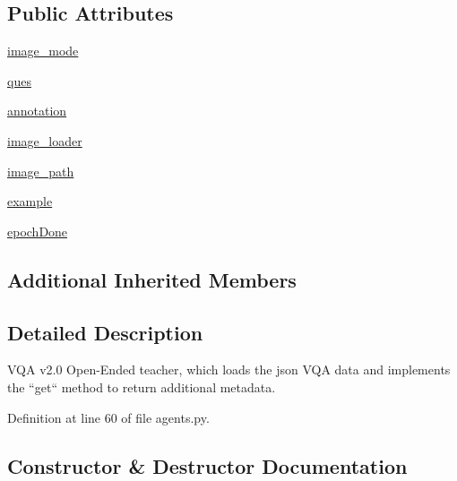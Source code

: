\subsection*{Public Attributes}
\begin{DoxyCompactItemize}
\item 
\hyperlink{classparlai_1_1tasks_1_1vqa__v2_1_1agents_1_1OeTeacher_a8f3225181d7dd82bc4f6356a45377e77}{image\+\_\+mode}
\item 
\hyperlink{classparlai_1_1tasks_1_1vqa__v2_1_1agents_1_1OeTeacher_a97e56f91309795ad390573355585a2f3}{ques}
\item 
\hyperlink{classparlai_1_1tasks_1_1vqa__v2_1_1agents_1_1OeTeacher_ad195c1182da5744f020d6181a7b99218}{annotation}
\item 
\hyperlink{classparlai_1_1tasks_1_1vqa__v2_1_1agents_1_1OeTeacher_a432beaf6869117f7ed76cb78d876996a}{image\+\_\+loader}
\item 
\hyperlink{classparlai_1_1tasks_1_1vqa__v2_1_1agents_1_1OeTeacher_a7a1259d5b801f1e7984700a31405189f}{image\+\_\+path}
\item 
\hyperlink{classparlai_1_1tasks_1_1vqa__v2_1_1agents_1_1OeTeacher_a949cbafa55cf6c1175a90c3b54d68426}{example}
\item 
\hyperlink{classparlai_1_1tasks_1_1vqa__v2_1_1agents_1_1OeTeacher_ae8240944a80920ce505269347bea3c6b}{epoch\+Done}
\end{DoxyCompactItemize}
\subsection*{Additional Inherited Members}


\subsection{Detailed Description}
\begin{DoxyVerb}VQA v2.0 Open-Ended teacher, which loads the json VQA data and implements the
``get`` method to return additional metadata.
\end{DoxyVerb}
 

Definition at line 60 of file agents.\+py.



\subsection{Constructor \& Destructor Documentation}
\mbox{\label{classparlai_1_1tasks_1_1vqa__v2_1_1agents_1_1OeTeacher_ae97aade64cf9108a8cb022721a13ebd4}} 
